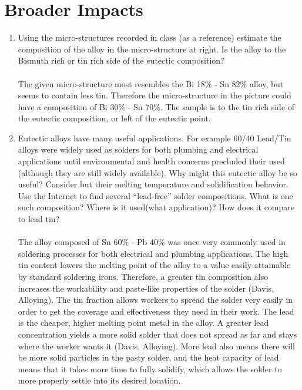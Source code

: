 \documentclass{article}
\begin{document}
\section{Broader Impacts}
\begin{enumerate}
\item Using the micro-structures recorded in class (as a reference) estimate the composition of the alloy in the micro-structure at right. Is the alloy to the Bismuth rich or tin rich side of the eutectic composition?
\paragraph{}
The given micro-structure most resembles the Bi 18\% - Sn 82\% alloy, but seems to contain less tin. Therefore the micro-structure in the picture could have a composition of Bi 30\% - Sn 70\%. The sample is to the tin rich side of the eutectic composition, or left of the eutectic point.

\item Eutectic alloys have many useful applications. For example 60/40 Lead/Tin alloys were widely used as solders for both plumbing and electrical applications until environmental and health concerns precluded their used (although they are still widely available). Why might this eutectic alloy be so useful? Consider but their melting temperature and solidification behavior. Use the Internet to find several “lead-free” solder compositions. What is one such composition? Where is it used(what application)? How does it compare to lead tin?
\paragraph{}
The alloy composed of Sn 60\% - Pb 40\% was once very commonly used in soldering processes for both electrical and plumbing applications. The high tin content lowers the melting point of the alloy to a value easily attainable by standard soldering irons. Therefore, a greater tin composition also increases the workability and paste-like properties of the solder (Davis, Alloying). The tin fraction allows workers to spread the solder very easily in order to get the coverage and effectiveness they need in their work. The lead is the cheaper, higher melting point metal in the alloy. A greater lead concentration yields a more solid solder that does not spread as far and stays where the worker wants it (Davis, Alloying). More lead also means there will be more solid particles in the pasty solder, and the heat capacity of lead means that it takes more time to fully solidify, which allows the solder to more properly settle into its desired location.


\end{enumerate}
\end{document}
